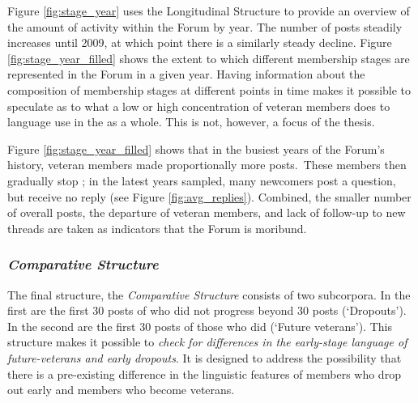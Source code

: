 Figure \ref{fig:stage_year} uses the Longitudinal Structure to provide an overview of the amount of activity within the \gls{Forum} by year. The number of \glspl{post} steadily increases until 2009, at which point there is a similarly steady decline. Figure \ref{fig:stage_year_filled} shows the extent to which different membership stages are represented in the \gls{Forum} in a given year. Having information about the composition of membership stages at different points in time makes it possible to speculate as to what a low or high concentration of veteran members does to language use in the  as a whole. This is not, however, a focus of the thesis.

Figure \ref{fig:stage_year_filled} shows that in the busiest years of the \gls{Forum}'s history, veteran \glspl{member} made proportionally more \glspl{post}.~These members then gradually stop ; in the latest years sampled, many newcomers \gls{post} a question, but receive no reply (see Figure \ref{fig:avg_replies}). Combined, the smaller number of overall \glspl{post}, the departure of veteran \glspl{member}, and lack of follow\hyp{}up to new \glspl{thread} are taken as indicators that the \gls{Forum} is moribund.

\subsubsection*{\emph{Comparative Structure}}

The final structure, the \emph{Comparative Structure} consists of two subcorpora. In the first are the first 30 \glspl{post} of  who did not progress beyond 30 \glspl{post} (`Dropouts'). In the second are the first 30 \glspl{post} of those  who did (`Future veterans'). This structure makes it possible to \emph{check for differences in the early\hyp{}stage language of future\hyp{}veterans and early dropouts}. It is designed to address the possibility that there is a pre\hyp{}existing difference in the linguistic features of \glspl{member} who drop out early and \glspl{member} who become veterans.

